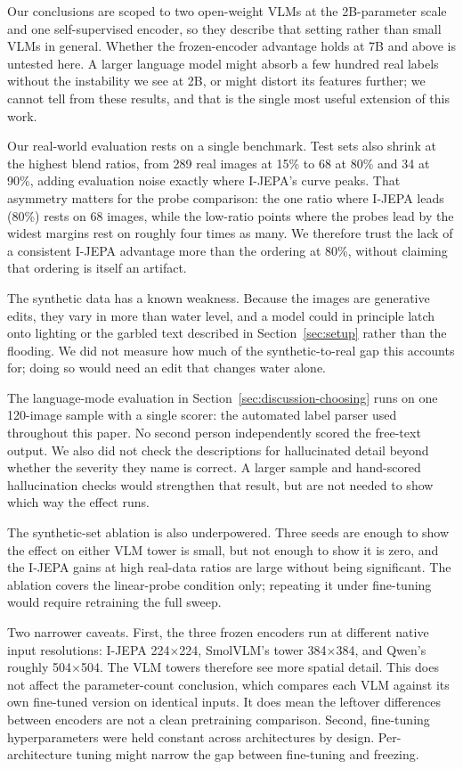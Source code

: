\documentclass[conference]{IEEEtran}
\begin{document}
Our conclusions are scoped to two open-weight VLMs at the 2B-parameter scale and one self-supervised encoder, so they describe that setting rather than small VLMs in general. Whether the frozen-encoder advantage holds at 7B and above is untested here. A larger language model might absorb a few hundred real labels without the instability we see at 2B, or might distort its features further; we cannot tell from these results, and that is the single most useful extension of this work.

Our real-world evaluation rests on a single benchmark. Test sets also shrink at the highest blend ratios, from 289 real images at 15\% to 68 at 80\% and 34 at 90\%, adding evaluation noise exactly where I-JEPA's curve peaks. That asymmetry matters for the probe comparison: the one ratio where I-JEPA leads (80\%) rests on 68 images, while the low-ratio points where the probes lead by the widest margins rest on roughly four times as many. We therefore trust the lack of a consistent I-JEPA advantage more than the ordering at 80\%, without claiming that ordering is itself an artifact.

The synthetic data has a known weakness. Because the images are generative edits, they vary in more than water level, and a model could in principle latch onto lighting or the garbled text described in Section~\ref{sec:setup} rather than the flooding. We did not measure how much of the synthetic-to-real gap this accounts for; doing so would need an edit that changes water alone.

The language-mode evaluation in Section~\ref{sec:discussion-choosing} runs on one 120-image sample with a single scorer: the automated label parser used throughout this paper. No second person independently scored the free-text output. We also did not check the descriptions for hallucinated detail beyond whether the severity they name is correct. A larger sample and hand-scored hallucination checks would strengthen that result, but are not needed to show which way the effect runs.

The synthetic-set ablation is also underpowered. Three seeds are enough to show the effect on either VLM tower is small, but not enough to show it is zero, and the I-JEPA gains at high real-data ratios are large without being significant. The ablation covers the linear-probe condition only; repeating it under fine-tuning would require retraining the full sweep.

Two narrower caveats. First, the three frozen encoders run at different native input resolutions: I-JEPA 224$\times$224, SmolVLM's tower 384$\times$384, and Qwen's roughly 504$\times$504. The VLM towers therefore see more spatial detail. This does not affect the parameter-count conclusion, which compares each VLM against its own fine-tuned version on identical inputs. It does mean the leftover differences between encoders are not a clean pretraining comparison. Second, fine-tuning hyperparameters were held constant across architectures by design. Per-architecture tuning might narrow the gap between fine-tuning and freezing.
\end{document}
